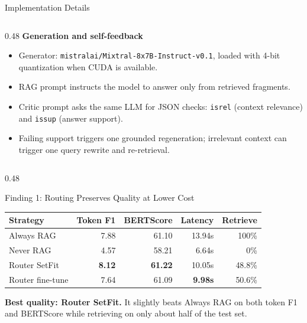 \documentclass[final]{beamer}
\newcommand{\code}[1]{\texttt{#1}}
\begin{document}
\begin{frame}[t]
\begin{block}{Implementation Details}
\begin{columns}[T,onlytextwidth]
\begin{column}{0.48\textwidth}
  \textbf{Generation and self-feedback}\\[0.3em]
  \small
  \begin{itemize}\setlength\itemsep{0.18em}
    \item Generator: \code{mistralai/Mixtral-8x7B-Instruct-v0.1}, loaded with 4-bit quantization when CUDA is available.
    \item RAG prompt instructs the model to answer only from retrieved fragments.
    \item Critic prompt asks the same LLM for JSON checks: \code{isrel} (context relevance) and \code{issup} (answer support).
    \item Failing support triggers one grounded regeneration; irrelevant context can trigger one query rewrite and re-retrieval.
  \end{itemize}
\end{column}

\end{columns}
\end{block}

\begin{columns}[t]

\begin{column}{0.48\textwidth}
  \begin{block}{Finding 1: Routing Preserves Quality at Lower Cost}
    \small
    \begin{tabular}{lrrrr}
      \toprule
      \textbf{Strategy} & \textbf{Token F1} & \textbf{BERTScore} & \textbf{Latency} & \textbf{Retrieve} \\
      \midrule
      Always RAG & 7.88 & 61.10 & 13.94s & 100\% \\
      Never RAG & 4.57 & 58.21 & 6.64s & 0\% \\
      Router SetFit & \textbf{8.12} & \textbf{61.22} & 10.05s & 48.8\% \\
      Router fine-tune & 7.64 & 61.09 & \textbf{9.98s} & 50.6\% \\
      \bottomrule
    \end{tabular}

    \vspace{0.5em}
    \textbf{\color{successgreen}Best quality: Router SetFit.}
    It slightly beats Always RAG on both token F1 and BERTScore while retrieving
    on only about half of the test set.


\end{block}
\end{column}
\end{columns}
\end{frame}
\end{document}
